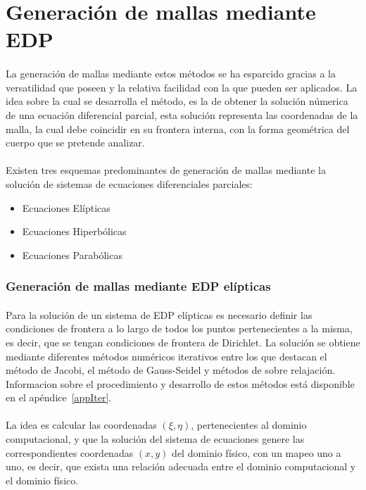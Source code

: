 \documentclass[letterpaper, openright, 12pt]{book}
\begin{document}
\section{Generación de mallas mediante EDP}
    \paragraph*{}
    La generación de mallas mediante estos métodos se ha esparcido gracias a
    la versatilidad que poseen y la relativa facilidad con la que pueden ser
    aplicados. La idea sobre la cual se desarrolla el método, es la de
    obtener la solución númerica de una ecuación diferencial parcial, esta
    solución representa las coordenadas de la malla, la cual debe coincidir
    en su frontera interna, con la forma geométrica del cuerpo que se
    pretende analizar.\cite{siladicParabolic}

    \paragraph*{}
    Existen tres esquemas predominantes de generación de mallas mediante la
    solución de sistemas de ecuaciones diferenciales parciales:
    \begin{itemize}
        \item Ecuaciones Elípticas
        \item Ecuaciones Hiperbólicas
        \item Ecuaciones Parabólicas
    \end{itemize}

    \subsubsection{Generación de mallas mediante EDP elípticas}
    \paragraph*{}
    Para la solución de un sistema de EDP elípticas es necesario definir las
    condiciones de frontera a lo largo de todos los puntos pertenecientes a la
    misma, es decir, que se tengan condiciones de frontera de Dirichlet.
    La solución se obtiene mediante diferentes métodos numéricos iterativos
    entre los que destacan el método de Jacobi, el método de Gauss-Seidel y
    métodos de sobre relajación. Informacion sobre el procedimiento y
    desarrollo de estos métodos está disponible en el apéndice~\ref{appIter}.

    \paragraph*{}
    La idea es calcular las coordenadas $(\xi, \eta)$, pertenecientes al
    dominio computacional, y que la solución del sistema de ecuaciones genere
    las correspondientes coordenadas $(x, y)$ del dominio físico, con un mapeo
    uno a uno, es decir, que exista una relación adecuada entre el dominio
    computacional y el dominio físico.
\end{document}
